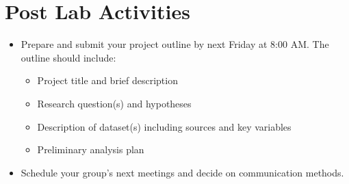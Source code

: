 \documentclass[12pt]{article}
\begin{document}
\vspace{2\baselineskip}

\section*{Post Lab Activities}

\begin{itemize}
    \item Prepare and submit your project outline by next Friday at 8:00 AM. The outline should include:  
    \begin{itemize}
        \item Project title and brief description  
        \item Research question(s) and hypotheses  
        \item Description of dataset(s) including sources and key variables  
        \item Preliminary analysis plan  
    \end{itemize}
    \item Schedule your group's next meetings and decide on communication methods.  
\end{itemize}
\end{document}
